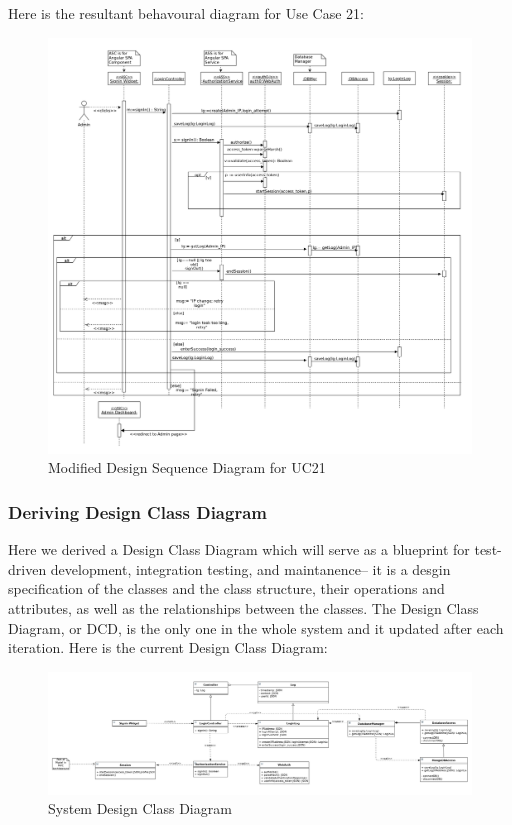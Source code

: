 \documentclass[11pt]{article}
\begin{document}
Here is the resultant behavoural diagram for Use Case 21:

\begin{figure}[H]
		\centering
		\hspace*{-1.7cm}\includegraphics[width=1.2\textwidth]{../../images/Patternted_Design_Sequence_Diagram_UC21.png}
		\caption{Modified Design Sequence Diagram for UC21}
\end{figure}
\subsubsection{Deriving Design Class Diagram}

Here we derived a Design Class Diagram which will serve as a blueprint for test-driven development, integration testing, and maintanence-- it is a desgin specification of the classes and the class structure, their operations and attributes, as well as the relationships between the classes\cite{Book:1}. The Design Class Diagram, or DCD, is the only one in the whole system and it updated after each iteration\cite{Book:1}. Here is the current Design Class Diagram:

\begin{figure}[H]
		\centering
		\hspace*{-1.7cm}\includegraphics[width=1.2\textwidth]{../../images/Design_Class_Diagram.png}
		\caption{System Design Class Diagram}
\end{figure}
\end{document}
